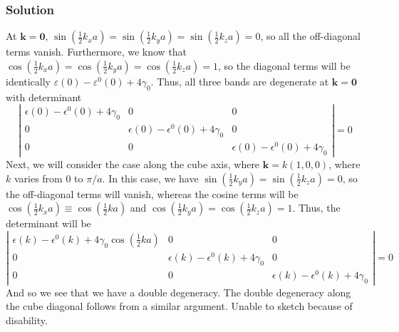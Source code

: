 \documentclass{article}
\begin{document}
\subsubsection{Solution}
At $\mathbf{k}=\mathbf{0}$, $\sin\left(\frac{1}{2} k_x a\right) = \sin\left(\frac{1}{2} k_y a\right) = \sin\left(\frac{1}{2} k_z a\right) = 0$, so all the off-diagonal terms vanish. Furthermore, we know that $\cos\left(\frac{1}{2} k_x a\right) = \cos\left(\frac{1}{2} k_y a\right) = \cos\left(\frac{1}{2} k_z a\right) = 1$, so the diagonal terms will be identically $\varepsilon(0) - \varepsilon^0(0) + 4\gamma_0$. Thus, all three bands are degenerate at $\mathbf{k}=\mathbf{0}$ with determinant
\begin{equation}
    \left| \begin{array}{ccc}
    \epsilon(0) - \epsilon^0(0) + 4\gamma_0 & 0 & 0\\
    0 & \epsilon(0) - \epsilon^0(0) + 4\gamma_0 & 0\\
    0 & 0 & \epsilon(0) - \epsilon^0(0) + 4\gamma_0
    \end{array} \right| = 0
\end{equation}
Next, we will consider the case along the cube axis, where $\mathbf{k} = k(1, 0, 0)$, where $k$ varies from $0$ to $\pi/a$. In this case, we have $\sin\left(\frac{1}{2} k_y a\right) = \sin\left(\frac{1}{2} k_z a\right) = 0$, so the off-diagonal terms will vanish, whereas the cosine terms will be $\cos\left(\frac{1}{2} k_x a \right) \equiv \cos\left(\frac{1}{2} k a\right)$ and $\cos\left(\frac{1}{2} k_y a\right) = \cos\left(\frac{1}{2} k_z a\right) = 1$. Thus, the determinant will be
\begin{equation}
    \left| \begin{array}{ccc}
    \epsilon(k) - \epsilon^0(k) + 4\gamma_0\cos\left(\frac{1}{2} k a\right) & 0 & 0\\
    0 & \epsilon(k) - \epsilon^0(k) + 4\gamma_0 & 0\\
    0 & 0 & \epsilon(k) - \epsilon^0(k) + 4\gamma_0
    \end{array} \right| = 0
\end{equation}
And so we see that we have a double degeneracy. The double degeneracy along the cube diagonal follows from a similar argument. Unable to sketch because of disability.
\end{document}
